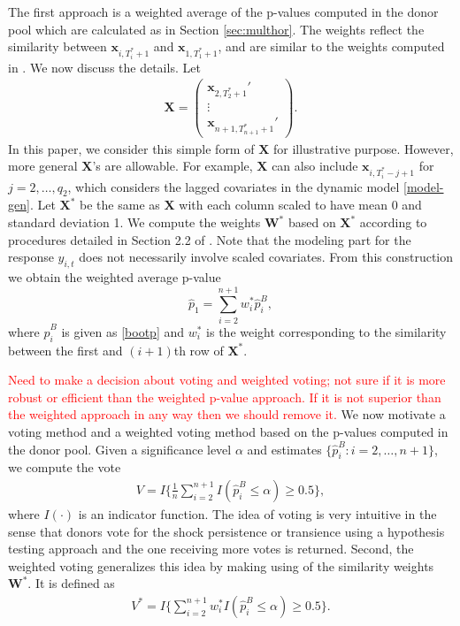 \documentclass[11pt]{article}
\newcommand{\x}{\textbf{x}}
\def\mbf#1{\mathbf{#1}} %
\def\bs#1{\boldsymbol{#1}}
\theoremstyle{definition}
\begin{document}
The first approach is a weighted average of the p-values computed in the donor pool which are calculated as in Section \ref{sec:multhor}. The weights reflect the similarity between $\x_{i,T^*_i+1}$ and $\x_{1,T^*_1+1}$, and are similar to the weights computed in \cite{lin2021minimizing}. We now discuss the details. Let
\begin{align*}
	\bs{X}= \begin{pmatrix}
		\bs{x}_{2, T_2^*+1}'  \\
		\vdots   \\
		\bs{x}_{n+1, T_{n+1}^*+1}' 
	\end{pmatrix}.
\end{align*}
In this paper, we consider this simple form of $\bs{X}$ for illustrative purpose. However,  more general $\bs{X}$'s are allowable. For example, $\bs{X}$ can also include $\bs{x}_{i, T_i^*-j+1}$ for $j = 2, \ldots, q_2$, which considers the lagged covariates in the dynamic model \eqref{model-gen}. Let $\bs{X}^*$ be the same as $\bs{X}$ with each column scaled to have mean 0 and standard deviation 1. We compute the weights $\mbf{W}^*$  based on $\bs{X}^*$ according to procedures detailed in Section 2.2 of \cite{lin2021minimizing}. Note that the modeling part for the response $y_{i,t}$ does not necessarily involve scaled covariates. From this construction we obtain the weighted average p-value 
\begin{equation} \label{wpval}
 \hat{p}_1 = \sum_{i=2}^{n+1} w_i^* \hat{p}_i^B,	
\end{equation}
where $\hat{p}_i^B$ is given as \eqref{bootp} and $w_i^*$ is the weight corresponding to the similarity between the first and $(i+1)$th row of $\mbf{X}^*$.

\textcolor{red}{Need to make a decision about voting and weighted voting; not sure if it is more robust or efficient than the weighted p-value approach. If it is not superior than the weighted approach in any way then we should remove it.} We now motivate a voting method and a weighted voting method based on the p-values computed in the donor pool. Given a significance level $\alpha$ and estimates $\{\hat{p}_i^B \colon i = 2, \ldots, n+1\}$, we compute the vote
\begin{align*}
	V = I\Big\{\frac{1}{n} \sum_{i=2}^{n+1} I (\hat{p}_i^B\leq \alpha) \geq 0.5\Big\},
\end{align*}
where $I(\cdot)$ is an indicator function. The idea of voting is very intuitive in the sense that donors vote for the shock persistence or transience  using a hypothesis testing approach and the one receiving more votes is returned.  Second, the weighted voting generalizes this idea by making using of  the similarity weights $\mbf{W}^*$. It is defined as 
\begin{align*}
	V^* = I\Big\{ \sum_{i=2}^{n+1} w_i^* I (\hat{p}_i^B\leq \alpha) \geq 0.5\Big\}.
\end{align*}
\end{document}
